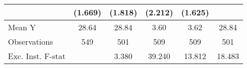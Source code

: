 {\begin{tabular}{l*{5}{c}}
            &     (1.669)         &     (1.818)         &     (2.212)         &     (1.625)         &                     \\
\midrule
Mean Y      &       28.64         &       28.84         &        3.60         &        3.62         &       28.84         \\
Observations&         549         &         501         &         509         &         509         &         501         \\
Exc. Inst. F-stat&                     &       3.380         &      39.240         &      13.812         &      18.483         \\
\bottomrule
\end{tabular}
}
